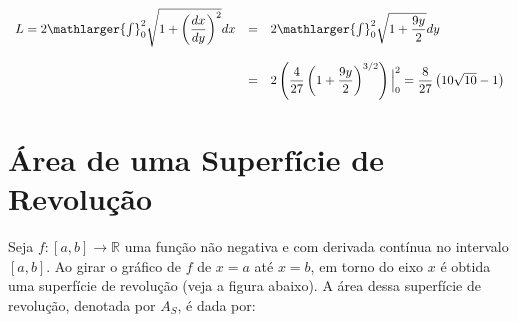\cleardoublepage\documentclass[../main.tex]{subfiles}
\begin{document}
\begin{ex}
\begin{compactenum}[a)]
\begin{solution}
\[ \begin{array}{rcl} L= 2\mathlarger{\int}^{2}_{0} \sqrt{ 1+ \left(\dfrac{dx}{dy}\right)^2} dx &= & 2\mathlarger{\int}^{2}_{0} \sqrt{ 1+ \dfrac{9y}{2}} dy \\ \\ &=& 2 \left(\dfrac{4}{27} \left(1+ \dfrac{9y}{2}\right)^{3/2} \right)\Big{|}^{2}_{0}=\dfrac{8}{27}\left(10\sqrt{10}-1 \right) \end{array} \]
\end{solution}
\end{compactenum}
\end{ex}
\section{Área de uma Superfície de Revolução}   
Seja \(f:[a,b] \to \mathbb{R}\) uma função não negativa e com derivada contínua no intervalo \([a,b]\). Ao girar o gráfico de \(f\) de \(x=a\) até \(x=b\), em torno do eixo \(x\) é obtida uma superfície de revolução (veja a figura abaixo). A área dessa superfície de revolução, denotada por \(A_S\), é dada por:
\end{document}
